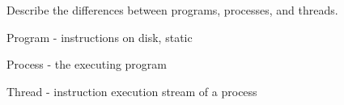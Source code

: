 Describe the differences between programs, processes, and threads.

\begin{answer}
Program - instructions on disk, static

Process - the executing program

Thread - instruction execution stream of a process
\end{answer}

